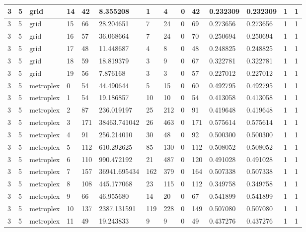 \documentclass[../thesis.tex]{subfiles}
\begin{document}
\begin{table}[!ht]
\begin{tabularx}{\textwidth}{|X|X|X|X|X|X|X|X|X|X|X|X|X|X|}
        3 & 5 & grid & 14 & 42 & 8.355208 & 1 & 4 & 0 & 42 & 0.232309 & 0.232309 & 1 & 1 \\ \hline
        3 & 5 & grid & 15 & 66 & 28.204651 & 7 & 24 & 0 & 69 & 0.273656 & 0.273656 & 1 & 1 \\ \hline
        3 & 5 & grid & 16 & 57 & 36.068664 & 7 & 24 & 0 & 70 & 0.250694 & 0.250694 & 1 & 1 \\ \hline
        3 & 5 & grid & 17 & 48 & 11.448687 & 4 & 8 & 0 & 48 & 0.248825 & 0.248825 & 1 & 1 \\ \hline
        3 & 5 & grid & 18 & 59 & 18.819379 & 3 & 9 & 0 & 67 & 0.322781 & 0.322781 & 1 & 1 \\ \hline
        3 & 5 & grid & 19 & 56 & 7.876168 & 3 & 3 & 0 & 57 & 0.227012 & 0.227012 & 1 & 1 \\ \hline
        3 & 5 & metroplex & 0 & 54 & 44.490644 & 5 & 15 & 0 & 60 & 0.492795 & 0.492795 & 1 & 1 \\ \hline
        3 & 5 & metroplex & 1 & 54 & 19.186857 & 10 & 10 & 0 & 54 & 0.413058 & 0.413058 & 1 & 1 \\ \hline
        3 & 5 & metroplex & 2 & 87 & 236.019197 & 25 & 212 & 0 & 91 & 0.419648 & 0.419648 & 1 & 1 \\ \hline
        3 & 5 & metroplex & 3 & 171 & 38463.741042 & 26 & 463 & 0 & 171 & 0.575614 & 0.575614 & 1 & 1 \\ \hline
        3 & 5 & metroplex & 4 & 91 & 256.214010 & 30 & 48 & 0 & 92 & 0.500300 & 0.500300 & 1 & 1 \\ \hline
        3 & 5 & metroplex & 5 & 112 & 610.292625 & 85 & 130 & 0 & 112 & 0.508052 & 0.508052 & 1 & 1 \\ \hline
        3 & 5 & metroplex & 6 & 110 & 990.472192 & 21 & 487 & 0 & 120 & 0.491028 & 0.491028 & 1 & 1 \\ \hline
        3 & 5 & metroplex & 7 & 157 & 36941.695434 & 162 & 379 & 0 & 164 & 0.507338 & 0.507338 & 1 & 1 \\ \hline
        3 & 5 & metroplex & 8 & 108 & 445.177068 & 23 & 115 & 0 & 112 & 0.349758 & 0.349758 & 1 & 1 \\ \hline
        3 & 5 & metroplex & 9 & 66 & 46.955680 & 14 & 20 & 0 & 67 & 0.541899 & 0.541899 & 1 & 1 \\ \hline
        3 & 5 & metroplex & 10 & 137 & 2387.131591 & 119 & 228 & 0 & 149 & 0.507080 & 0.507080 & 1 & 1 \\ \hline
        3 & 5 & metroplex & 11 & 49 & 19.243833 & 9 & 9 & 0 & 49 & 0.437276 & 0.437276 & 1 & 1 \\ \hline

\end{tabularx}
\end{table}
\end{document}
